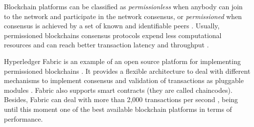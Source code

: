 \documentclass[sigplan]{acmart}
\begin{document}
Blockchain platforms can be classified as \emph{permissionless} when anybody can join to the network and participate in the network consensus, or \emph{permissioned} when consensus is achieved by a set of known and identifiable peers \cite{Vukolic2016,Androulaki2018}. 
Usually, permissioned blockchains consensus protocols expend less computational resources and can reach better transaction latency and throughput \cite{Sousa2018}.

Hyperledger Fabric is an example of an open source platform for implementing permissioned blockchains \cite{Androulaki2018}.
It provides a flexible architecture to deal with different mechanisms to implement consensus and validation of transactions as pluggable modules \cite{Sousa2018}.
Fabric also supports smart contracts (they are called chaincodes).
Besides, Fabric can deal with more than 2,000 transactions per second \cite{Androulaki2018}, being until this moment one of the best available blockchain platforms in terms of performance.

\end{document}

